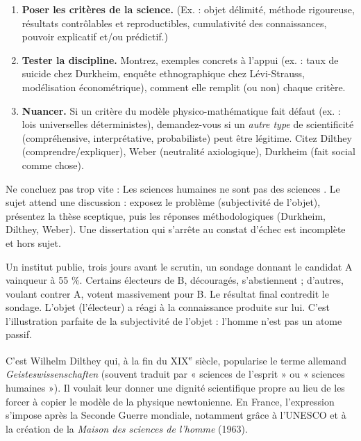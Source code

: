 \documentclass[11pt]{article}
\newcommand{\cle}[1]{{\popxbold\color{popdark}#1}}
\begin{document}
\begin{methode}
\begin{enumerate}
    \item \textbf{Poser les critères de la science.} (Ex. : objet délimité, méthode rigoureuse, résultats contrôlables et reproductibles, cumulativité des connaissances, pouvoir explicatif et/ou prédictif.)
    \item \textbf{Tester la discipline.} Montrez, exemples concrets à l'appui (ex. : taux de suicide chez Durkheim, enquête ethnographique chez Lévi-Strauss, modélisation économétrique), comment elle remplit (ou non) chaque critère.
    \item \textbf{Nuancer.} Si un critère du modèle physico-mathématique fait défaut (ex. : lois universelles déterministes), demandez-vous si un \emph{autre type} de scientificité (compréhensive, interprétative, probabiliste) peut être légitime. Citez Dilthey (comprendre/expliquer), Weber (neutralité axiologique), Durkheim (fait social comme chose).
\end{enumerate}
\end{methode}

\begin{attention}
Ne concluez pas trop vite : \guillemotleft Les sciences humaines ne sont pas des sciences \guillemotright. Le sujet attend une \cle{discussion} : exposez le problème (subjectivité de l'objet), présentez la thèse sceptique, puis les réponses méthodologiques (Durkheim, Dilthey, Weber). Une dissertation qui s'arrête au constat d'échec est incomplète et hors sujet.
\end{attention}

\begin{exemplebox}
Un institut publie, trois jours avant le scrutin, un sondage donnant le candidat A vainqueur à 55 \%. Certains électeurs de B, découragés, s'abstiennent ; d'autres, voulant contrer A, votent massivement pour B. Le résultat final contredit le sondage. L'objet (l'électeur) a réagi à la connaissance produite sur lui. C'est l'illustration parfaite de la \cle{subjectivité de l'objet} : l'homme n'est pas un atome passif.
\end{exemplebox}

\begin{savaistu}
C'est Wilhelm Dilthey qui, à la fin du XIX\textsuperscript{e} siècle, popularise le terme allemand \emph{Geisteswissenschaften} (souvent traduit par « sciences de l'esprit » ou « sciences humaines »). Il voulait leur donner une \cle{dignité scientifique propre} au lieu de les forcer à copier le modèle de la physique newtonienne. En France, l'expression s'impose après la Seconde Guerre mondiale, notamment grâce à l'UNESCO et à la création de la \emph{Maison des sciences de l'homme} (1963).
\end{savaistu}
\end{document}
